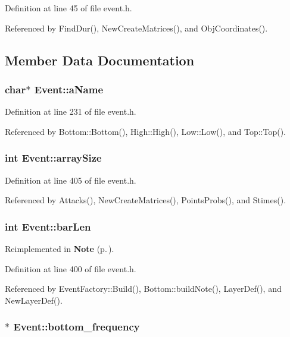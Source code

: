 Definition at line 45 of file event.h.

Referenced by Find\-Dur(), New\-Create\-Matrices(), and Obj\-Coordinates().

\subsection{Member Data Documentation}
\subsubsection{\setlength{\rightskip}{0pt plus 5cm}char$\ast$ {\bf Event::a\-Name}}\label{classEvent_o9}




Definition at line 231 of file event.h.

Referenced by Bottom::Bottom(), High::High(), Low::Low(), and Top::Top().
\subsubsection{\setlength{\rightskip}{0pt plus 5cm}int {\bf Event::array\-Size}}\label{classEvent_o25}




Definition at line 405 of file event.h.

Referenced by Attacks(), New\-Create\-Matrices(), Points\-Probs(), and Stimes().
\subsubsection{\setlength{\rightskip}{0pt plus 5cm}int {\bf Event::bar\-Len}}\label{classEvent_o16}




Reimplemented in {\bf Note} {\rm (p.\,\pageref{classNote_r6})}.

Definition at line 400 of file event.h.

Referenced by Event\-Factory::Build(), Bottom::build\-Note(), Layer\-Def(), and New\-Layer\-Def().
\subsubsection{$\ast$ {\bf Event::bottom\_\-frequency}\hspace{0.3cm}{\tt  [protected]}}\label{classEvent_p0}





